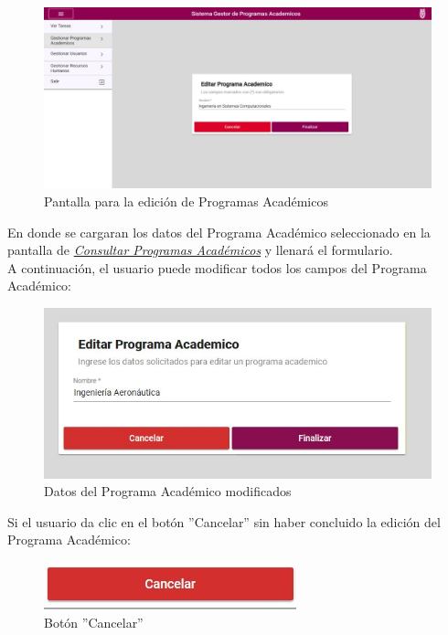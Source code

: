         \begin{figure}[!hbtp]
        	\centering
        	\hypertarget{editarpa}{\includegraphics[width=0.7\linewidth]{images/SP3/EditarPA}}
        	\caption{Pantalla para la edición de Programas Académicos}
        	\label{editarpa}
        \end{figure}

        En donde se cargaran los datos del Programa Académico seleccionado en la pantalla de \hyperlink{consultarpa}{\textit{Consultar Programas Académicos}} y llenará el formulario.\\

        A continuación, el usuario puede modificar todos los campos del Programa Académico:
        \begin{figure}[!hbtp]
        	\centering
        	\hypertarget{modif}{\includegraphics[width=0.7\linewidth]{images/SP3/Editado}}
        	\caption{Datos del Programa Académico modificados}
        	\label{modif}
        \end{figure}

        Si el usuario da clic en el botón ''Cancelar'' sin haber concluido la edición del Programa Académico:

        \begin{figure}[!hbtp]
        	\centering
        	\hypertarget{cancel2}{\includegraphics[width=0.7\linewidth]{images/SP3/BtnCancelar}}
        	\caption{Botón ''Cancelar''}
        	\label{cancel2}
        \end{figure}

